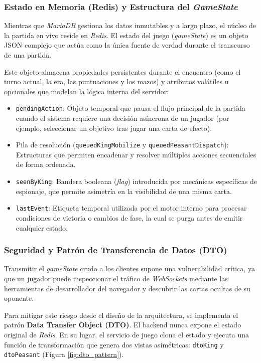 \subsubsection{Estado en Memoria (Redis) y Estructura del \textit{GameState}}

Mientras que \textit{MariaDB} gestiona los datos inmutables y a largo plazo, el núcleo de la partida en vivo reside en \textit{Redis}. El estado del juego (\textit{gameState}) es un objeto JSON complejo que actúa como la única fuente de verdad durante el transcurso de una partida.

Este objeto almacena propiedades persistentes durante el encuentro (como el turno actual, la era, las puntuaciones y los mazos) y atributos volátiles u opcionales que modelan la lógica interna del servidor:
\begin{itemize}
    \item \texttt{pendingAction}: Objeto temporal que pausa el flujo principal de la partida cuando el sistema requiere una decisión asíncrona de un jugador (por ejemplo, seleccionar un objetivo tras jugar una carta de efecto).
    \item Pila de resolución (\texttt{queuedKingMobilize} y \texttt{queuedPeasantDispatch}): Estructuras que permiten encadenar y resolver múltiples acciones secuenciales de forma ordenada.
    \item \texttt{seenByKing}: Bandera booleana (\textit{flag}) introducida por mecánicas específicas de espionaje, que permite asimetría en la visibilidad de una misma carta.
    \item \texttt{lastEvent}: Etiqueta temporal utilizada por el motor interno para procesar condiciones de victoria o cambios de fase, la cual se purga antes de emitir cualquier estado.
\end{itemize}

\subsubsection{Seguridad y Patrón de Transferencia de Datos (DTO)}

Transmitir el \textit{gameState} crudo a los clientes supone una vulnerabilidad crítica, ya que un jugador puede inspeccionar el tráfico de \textit{WebSockets} mediante las herramientas de desarrollador del navegador y descubrir las cartas ocultas de su oponente.

Para mitigar este riesgo desde el diseño de la arquitectura, se implementa el patrón \textbf{Data Transfer Object (DTO)}. El backend nunca expone el estado original de \textit{Redis}. En su lugar, el servicio de juego clona el estado y ejecuta una función de transformación que genera dos vistas asimétricas: \texttt{dtoKing} y \texttt{dtoPeasant} (Figura \ref{fig:dto_pattern}).

